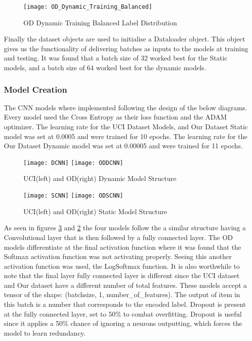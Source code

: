 \begin{figure}[h]
\centering
\texttt{[image: OD\_Dynamic\_Training\_Balanced]}\hfill
\caption*{OD Dynamic Training Balanced Label Distribution}
\label{fig:figureX}
\end{figure}

Finally the dataset objects are used to initialise a Dataloader object.
This object gives us the functionality of delivering batches as inputs to the models at training and testing.
It was found that a batch size of 32 worked best for the Static models, and a batch size of 64 worked best for the dynamic models.

\subsubsection{Model Creation}
The CNN models where implemented following the design of the below diagrams.
Every model used the Cross Entropy as their loss function and the ADAM optimizer.
The learning rate for the UCI Dataset Models, and Our Dataset Static model was set at 0.0005 and were trained for 10 epochs.
The learning rate for the Our Dataset Dynamic model was set at 0.00005 and were trained for 11 epochs.

\begin{figure}[h]
\centering
\texttt{[image: DCNN]}\hfill
\texttt{[image: ODDCNN]}\hfill
\caption*{UCI(left) and OD(right) Dynamic Model Structure}
\label{Dynamic_Models}
\end{figure}

\begin{figure}[h]
\centering
\texttt{[image: SCNN]}\hfill
\texttt{[image: ODSCNN]}\hfill
\caption*{UCI(left) and OD(right) Static Model Structure}
\label{Static_Models}
\end{figure}

As seen in figures \ref{Static_Models} and \ref{Dynamic_Models} the four models follow the a similar structure having a Convolutional layer that is then followed by a fully connected layer.
The OD models differentiate at the final activation function where it was found that the Softmax activation function was not activating properly.
Seeing this another activation function was used, the LogSoftmax function.
It is also worthwhile to note that the final layer fully connected layer is different since the UCI dataset and Our dataset have a different number of total features.
These models accept a tensor of the shape: (batchsize, 1, number\_of\_features).
The output of item in this batch is a number that corresponds to the encoded label.
Dropout is present at the fully connected layer, set to 50\% to combat overfitting.
Dropout is useful since it applies a 50\% chance of ignoring a neurons outputting, which forces the model to learn redundancy.